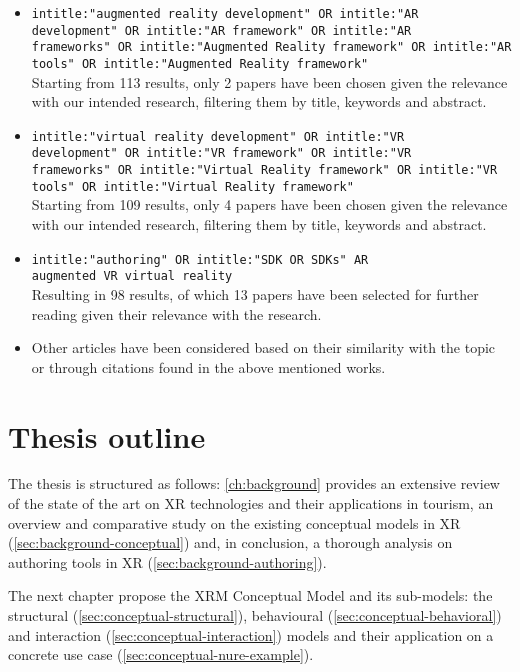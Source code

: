 \begin{enumerate}
        \begin{itemize}
            \item \texttt{intitle:"augmented reality development" OR intitle:"AR\\ development" OR intitle:"AR framework" OR intitle:"AR\\ frameworks" OR intitle:"Augmented Reality framework" OR intitle:"AR tools" OR intitle:"Augmented Reality framework"}\\
            Starting from 113 results, only 2 papers have been chosen given the relevance with our intended research, filtering them by title, keywords and abstract.
            \item \texttt{intitle:"virtual reality development" OR intitle:"VR\\ development" OR intitle:"VR framework" OR intitle:"VR\\ frameworks" OR intitle:"Virtual Reality framework" OR intitle:"VR tools" OR intitle:"Virtual Reality framework"}\\
            Starting from 109 results, only 4 papers have been chosen given the relevance with our intended research, filtering them by title, keywords and abstract.
            \item \texttt{intitle:"authoring" OR intitle:"SDK OR SDKs" AR\\ augmented VR virtual reality}\\
            Resulting in 98 results, of which 13 papers have been selected for further reading given their relevance with the research.
            \item Other articles have been considered based on their similarity with the topic or through citations found in the above mentioned works.
        \end{itemize}
\end{enumerate}

\section{Thesis outline}
The thesis is structured as follows: \autoref{ch:background} provides an extensive review of the state of the art on XR technologies and their applications in tourism, an overview and comparative study on the existing conceptual models in XR (\autoref{sec:background-conceptual}) and, in conclusion, a thorough analysis on authoring tools in XR (\autoref{sec:background-authoring}).

The next chapter propose the XRM Conceptual Model and its sub-models: the structural (\autoref{sec:conceptual-structural}), behavioural (\autoref{sec:conceptual-behavioral}) and interaction (\autoref{sec:conceptual-interaction}) models and their application on a concrete use case (\autoref{sec:conceptual-nure-example}). 

